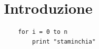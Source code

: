 \documentclass[12pt, a4paper]{article}
\begin{document}
\clearpage


\section{Introduzione}
\begin{lstlisting}
	for i = 0 to n
		print "staminchia"
\end{lstlisting}
 






\end{document}
